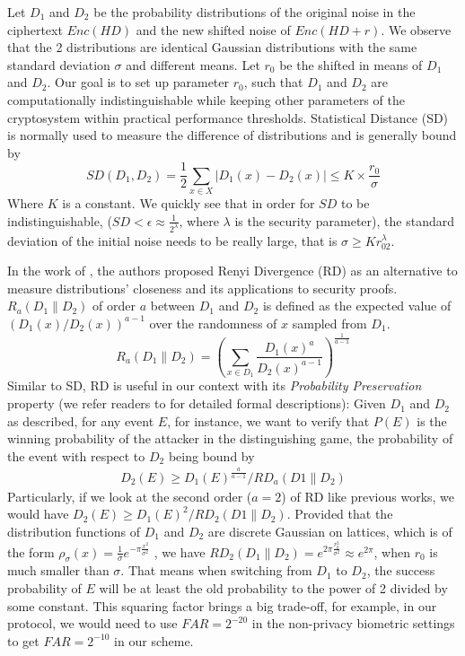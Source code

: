 Let $D_1$ and $D_2$ be the probability distributions of the original noise in the ciphertext $Enc(HD)$ and the new shifted noise of $Enc(HD+r)$. We observe that the
2 distributions are identical Gaussian distributions with the same standard deviation
$\sigma$ and different means. Let $r_0$ be the shifted in means of $D_1$ and $D_2$.
Our goal is to set up parameter $r_0$, such that $D_1$ and $D_2$ are computationally
indistinguishable while keeping other parameters of the cryptosystem within practical
performance
thresholds. Statistical Distance (SD) is normally used to measure the difference of distributions and is generally bound by
\[
SD(D_1, D_2) = \frac{1}{2}\sum_{x\in X}|D_1(x) - D_2(x)| \leq K\times \frac{r_0}
{\sigma}
\]
Where $K$ is a constant. We quickly see that in order for $SD$ to be indistinguishable, ($SD < \epsilon \approx \frac{1}{2^\lambda}$, where $\lambda$ is
the security parameter), the standard deviation of the initial noise needs to be really large, that is $\sigma \geq Kr_02^\lambda$.

In the work of \cite{bai2015improved}, the authors proposed Renyi Divergence (RD) as
an alternative to measure distributions' closeness and its applications to security proofs. $R_a(D_1\|D_2)$ of order $a$
between $D_1$ and $D_2$ is defined as the expected value of $(D_1(x)/D_2(x))^{a-1}$ over the randomness of $x$ sampled from $D_1$.
\[
R_a(D_1\|D_2) = \left( \sum_{x \in D_1}\frac{D_1(x)^a}{D_2(x)^{a-1}} \right)^
{\frac{1}{a-1}}
\]
Similar to SD, RD is useful in our context with its \textit{Probability Preservation} property (we refer readers to \cite{bai2015improved} for detailed formal
descriptions): Given $D_1$ and $D_2$ as described, for any event $E$, for instance, we want to verify that $P(E)$ is the winning probability of the attacker in the distinguishing game, the probability of the event with respect to $D_2$ being bound by
\begin{align}
\label{eq:renyi}
D_2(E) \geq D_1(E)^{\frac{a}{a-1}}/RD_a(D1\|D_2)
\end{align}
Particularly, if we look at the second order ($a = 2$) of RD like previous works, we would have
$
D_2(E) \geq D_1(E)^2/RD_2(D1\|D_2)
$.
Provided that the distribution functions of $D_1$ and $D_2$ are discrete Gaussian on lattices, which is of the form $\rho_\sigma(x) = \frac{1}{\sigma}e^{-\pi\frac{x^2}
	{\sigma^2}}$ , we have $RD_2(D_1\|D_2) = e^{2\pi \frac{r_0^2}{\sigma^2}}
\approx e^{2\pi}$, when $r_0$ is much smaller than $\sigma$. That means when switching from $D_1$ to $D_2$, the success probability of $E$ will be at least the old probability to the power of 2 divided by some constant. This squaring factor
brings a big trade-off, for example, in our protocol, we would need to use $FAR = 2^{-20}$ in the non-privacy biometric settings to get $FAR=2^{-10}$ in our scheme.

